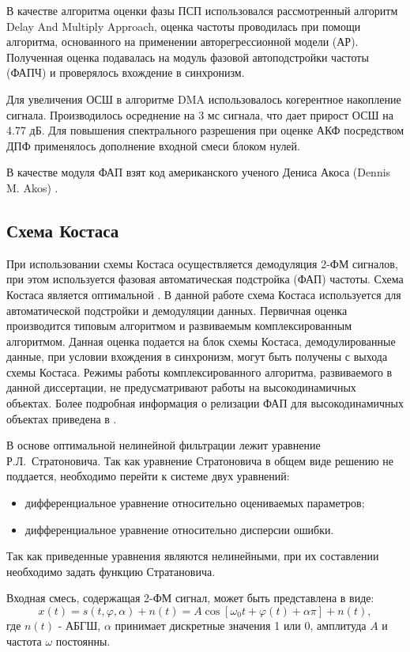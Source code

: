 В качестве алгоритма оценки фазы ПСП использовался
рассмотренный алгоритм Delay And Multiply Approach, оценка частоты проводилась при помощи алгоритма, основанного на применении авторегрессионной модели (АР).
Полученная оценка подавалась на модуль фазовой автоподстройки частоты (ФАПЧ) и проверялось вхождение в синхронизм.

Для увеличения ОСШ в алгоритме DMA использовалось когерентное накопление сигнала. Производилось осреднение на 3 мс сигнала, что дает прирост ОСШ на 4.77 дБ.
Для повышения спектрального разрешения при оценке АКФ посредством ДПФ применялось дополнение входной смеси блоком нулей.

В качестве модуля ФАП взят код американского ученого Дениса Акоса (Dennis M. Akos) \cite{sandiaproject}.
\subsection{Схема Костаса}

При использовании схемы Костаса осуществляется демодуляция 2-ФМ сигналов, при этом используется фазовая автоматическая подстройка (ФАП) частоты. Схема
Костаса является оптимальной \cite{shahtarin-wiener-kalman}. В данной работе схема Костаса используется для автоматической подстройки и демодуляции данных. Первичная
оценка производится типовым алгоритмом и развиваемым комплексированным алгоритмом. Данная оценка подается на блок схемы Костаса, демодулированные данные, при условии
вхождения в синхронизм, могут быть получены с выхода схемы Костаса. Режимы работы комплексированного алгоритма, развиваемого в данной диссертации,
не предусматривают работы на высокодинамичных объектах. Более подробная информация о релизации ФАП для высокодинамичных объектах приведена в \cite{fomenko_phd}.

В основе оптимальной нелинейной фильтрации лежит уравнение \mbox{Р.Л. Стратоновича}. Так как уравнение Стратоновича в общем виде решению не поддается, необходимо
перейти к системе двух уравнений:
\begin{itemize}
	\item дифференциальное уравнение относительно оцениваемых параметров;
	\item дифференциальное уравнение относительно дисперсии ошибки.
\end{itemize}

Так как приведенные уравнения являются нелинейными, при их составлении необходимо задать функцию Стратановича.

Входная смесь, содержащая 2-ФМ сигнал, может быть представлена в виде:
\begin{equation}
	x(t) = s(t, \varphi, \alpha) + n(t) = A \cos \left[ \omega_0t + \varphi(t) +\alpha \pi \right] + n(t),
	\label{eq:sec4_sig}
\end{equation}
где ${n(t)}$ - АБГШ, ${\alpha}$ принимает дискретные значения 1 или 0, амплитуда ${A}$ и частота ${\omega}$ постоянны.

